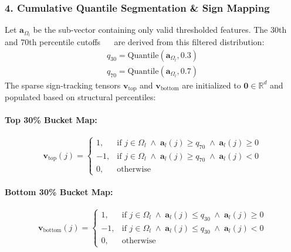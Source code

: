 \documentclass[10pt,conference]{IEEEtran}
\begin{document}
\subsubsection*{4. Cumulative Quantile Segmentation \& Sign Mapping}
Let $\mathbf{a}_{\Omega_l}$ be the sub-vector containing only valid thresholded features. The 30th and 70th percentile cutoffs~\cite{paul2025quantile} ~\cite{nanoquant2026efficient} are derived from this filtered distribution:
\[
\begin{aligned}
q_{30} = \text{Quantile}(\mathbf{a}_{\Omega_l}, 0.3) \\
q_{70} = \text{Quantile}(\mathbf{a}_{\Omega_l}, 0.7)
\end{aligned}
\]
The sparse sign-tracking tensors $\mathbf{v}_{\text{top}}$ and $\mathbf{v}_{\text{bottom}}$ are initialized to $\mathbf{0} \in \mathbb{R}^d$ and populated based on structural percentiles:
\paragraph{Top 30\% Bucket Map:}
\[
\mathbf{v}_{\text{top}}(j) = \begin{cases}  1, & \text{if } j \in \Omega_l \;\land\; \mathbf{a}_l(j) \ge q_{70} \;\land\; \mathbf{a}_l(j) \ge 0 \\  -1, & \text{if } j \in \Omega_l \;\land\; \mathbf{a}_l(j) \ge q_{70} \;\land\; \mathbf{a}_l(j) < 0 \\  0, & \text{otherwise}  \end{cases}
\]
\paragraph{Bottom 30\% Bucket Map:}
\[
\mathbf{v}_{\text{bottom}}(j) = \begin{cases}  1, & \text{if } j \in \Omega_l \;\land\; \mathbf{a}_l(j) \le q_{30} \;\land\; \mathbf{a}_l(j) \ge 0 \\  -1, & \text{if } j \in \Omega_l \;\land\; \mathbf{a}_l(j) \le q_{30} \;\land\; \mathbf{a}_l(j) < 0 \\  0, & \text{otherwise}  \end{cases}
\]
\end{document}
